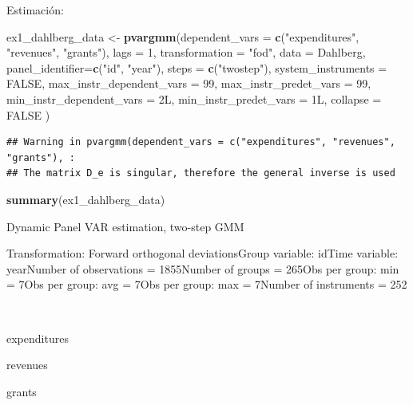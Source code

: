 \documentclass[
]{book}
\newenvironment{Shaded}{\begin{snugshade}}{\end{snugshade}}
\newcommand{\AttributeTok}[1]{\textcolor[rgb]{0.13,0.29,0.53}{#1}}
\newcommand{\ConstantTok}[1]{\textcolor[rgb]{0.56,0.35,0.01}{#1}}
\newcommand{\DecValTok}[1]{\textcolor[rgb]{0.00,0.00,0.81}{#1}}
\newcommand{\FunctionTok}[1]{\textcolor[rgb]{0.13,0.29,0.53}{\textbf{#1}}}
\newcommand{\NormalTok}[1]{#1}
\newcommand{\OtherTok}[1]{\textcolor[rgb]{0.56,0.35,0.01}{#1}}
\newcommand{\StringTok}[1]{\textcolor[rgb]{0.31,0.60,0.02}{#1}}
\begin{document}
Estimación:

\begin{Shaded}
\begin{Highlighting}[]
\NormalTok{ex1\_dahlberg\_data }\OtherTok{\textless{}{-}} \FunctionTok{pvargmm}\NormalTok{(}\AttributeTok{dependent\_vars =} \FunctionTok{c}\NormalTok{(}\StringTok{"expenditures"}\NormalTok{, }\StringTok{"revenues"}\NormalTok{, }\StringTok{"grants"}\NormalTok{),}
          \AttributeTok{lags =} \DecValTok{1}\NormalTok{,}
          \AttributeTok{transformation =} \StringTok{"fod"}\NormalTok{,}
          \AttributeTok{data =}\NormalTok{ Dahlberg,}
          \AttributeTok{panel\_identifier=}\FunctionTok{c}\NormalTok{(}\StringTok{"id"}\NormalTok{, }\StringTok{"year"}\NormalTok{),}
          \AttributeTok{steps =} \FunctionTok{c}\NormalTok{(}\StringTok{"twostep"}\NormalTok{),}
          \AttributeTok{system\_instruments =} \ConstantTok{FALSE}\NormalTok{,}
          \AttributeTok{max\_instr\_dependent\_vars =} \DecValTok{99}\NormalTok{,}
          \AttributeTok{max\_instr\_predet\_vars =} \DecValTok{99}\NormalTok{,}
          \AttributeTok{min\_instr\_dependent\_vars =}\NormalTok{ 2L,}
          \AttributeTok{min\_instr\_predet\_vars =}\NormalTok{ 1L,}
          \AttributeTok{collapse =} \ConstantTok{FALSE}
\NormalTok{  )}
\end{Highlighting}
\end{Shaded}

\begin{verbatim}
## Warning in pvargmm(dependent_vars = c("expenditures", "revenues", "grants"), :
## The matrix D_e is singular, therefore the general inverse is used
\end{verbatim}

\begin{Shaded}
\begin{Highlighting}[]
\FunctionTok{summary}\NormalTok{(ex1\_dahlberg\_data)}
\end{Highlighting}
\end{Shaded}

Dynamic Panel VAR estimation, two-step GMM

Transformation: Forward orthogonal deviationsGroup variable: idTime variable: yearNumber of observations = 1855Number of groups = 265Obs per group: min = 7Obs per group: avg = 7Obs per group: max = 7Number of instruments = 252

~

expenditures

revenues

grants
\end{document}
